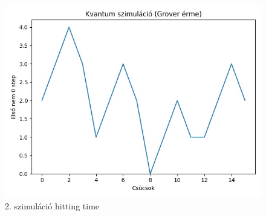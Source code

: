 \documentclass[14pt,a4paper]{article}
\begin{document}
\begin{figure}[H]
\centering
\includegraphics[width = 0.7\columnwidth]{sim_02/hitting_time.jpg}
\caption{2. szimuláció hitting time}
\end{figure}
\end{document}
